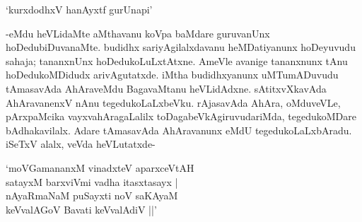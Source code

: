 \begin{shloka}
`kurxdodhxV hanAyxtf gurUnapi'
\end{shloka}

-eMdu heVLidaMte aMthavanu koVpa baMdare guruvanUnx hoDedubiDuvanaMte. budidhx sariyAgilalxdavanu heMDatiyanunx hoDeyuvudu sahaja; tananxnUnx hoDedukoLuLxtAtxne. AmeVle avanige tananxnunx tAnu hoDedukoMDidudx arivAgutatxde. iMtha budidhxyanunx uMTumADuvudu tAmasavAda AhAraveMdu BagavaMtanu heVLidAdxne. sAtitxvXkavAda AhAravanenxV nAnu tegedukoLaLxbeVku. rAjasavAda AhAra, oMduveVLe, pArxpaMcika vayxvahAragaLalilx toDagabeVkAgiruvudariMda, tegedukoMDare bAdhakavilalx. Adare tAmasavAda AhAravanunx eMdU tegedukoLaLxbAradu. iSeTxV alalx, veVda heVLutatxde-

\begin{shloka}
`moVGamananxM vinadxteV aparxceVtAH\\
satayxM barxviVmi vadha itasxtasayx |\\
nAyaRmaNaM puSayxti noV saKAyaM\\
keVvalAGoV Bavati keVvalAdiV ||'
\end{shloka}

